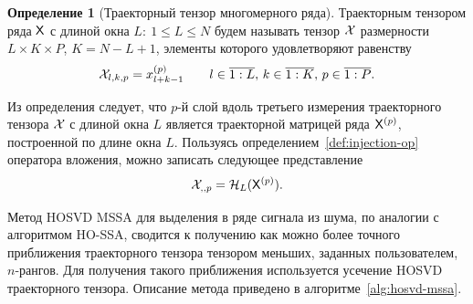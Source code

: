 \documentclass[specialist,
    substylefile = spbu_report.rtx,
    subf,href,colorlinks=true, 12pt]{disser}
\theoremstyle{plain}
\theoremstyle{definition}
\newtheorem{definition}{Определение}[section]
\theoremstyle{remark}
\begin{document}
    \begin{definition}[Траекторный тензор многомерного ряда]
        Траекторным тензором ряда $\mathsf{X}$ с длиной окна $L:\: 1\leqslant L \leqslant N$ будем называть тензор $\mathcal{X}$
        размерности ${L \times K \times P}$, ${K = N - L + 1}$, элементы которого удовлетворяют равенству
        \[
            \mathcal{X}_{l,k,p}=x_{l+k-1}^{(p)} \qquad l \in \overline{1:L},\, k \in \overline{1:K},\, p \in \overline{1:P}.
        \]\label{def:trajectory-tensor-mssa}
    \end{definition}

    Из определения следует, что $p$-й слой вдоль третьего измерения траекторного тензора $\mathcal{X}$ с длиной окна $L$
    является траекторной матрицей ряда $\mathsf{X}^{(p)}$, построенной по длине окна $L$.
    Пользуясь определением~\ref{def:injection-op} оператора вложения, можно записать следующее представление
    \[
        \mathcal{X}_{,,p} = \mathcal{H}_L (\mathsf{X}^{(p)}).
    \]

    Метод HOSVD MSSA для выделения в ряде сигнала из шума, по аналогии с алгоритмом HO-SSA,
    сводится к получению как можно более точного приближения траекторного тензора тензором меньших,
    заданных пользователем, $n$-рангов.
    Для получения такого приближения используется усечение HOSVD траекторного тензора.
    Описание метода приведено в алгоритме~\ref{alg:hosvd-mssa}.

\end{document}
